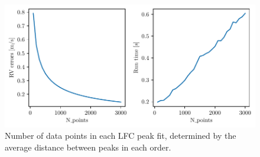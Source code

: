 \begin{figure}%
    \begin{wide}  
    \includegraphics[scale=0.72]{figures/err_vs_run_time.pdf}
    \caption{Number of data points in each LFC peak fit, determined by the average distance between peaks in each order.}
    \label{fig:err_vs_run_time}
\end{wide}
\end{figure}



